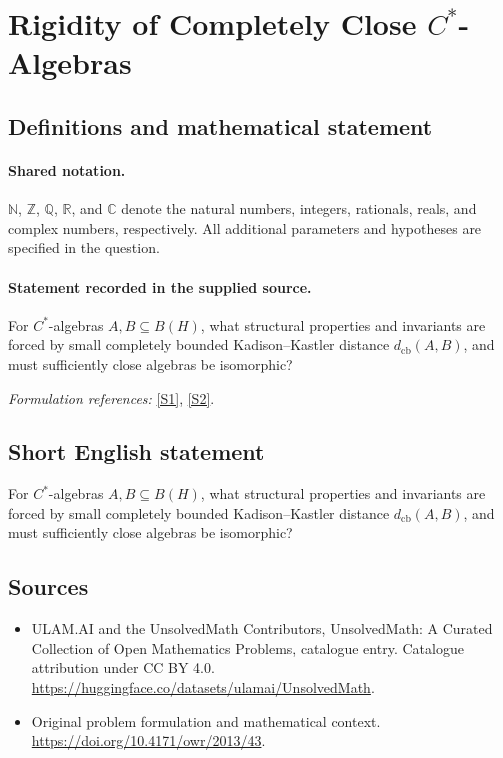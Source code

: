 \documentclass[11pt]{article}
\newcommand{\sref}[2]{\hyperlink{source:#1:#2}{[S#2]}}
\begin{document}
\section{\texorpdfstring{Rigidity of Completely Close $C^*$-Algebras}{Rigidity of Completely Close C\textasciicircum{}*-Algebras}}\label{statement}

\subsection{Definitions and mathematical statement}

\paragraph{Shared notation.}$\mathbb N$, $\mathbb Z$, $\mathbb Q$, $\mathbb R$, and $\mathbb C$ denote the natural numbers, integers, rationals, reals, and complex numbers, respectively. All additional parameters and hypotheses are specified in the question.


\paragraph{Statement recorded in the supplied source.}
For $C^*$-algebras $A,B\subseteq B(H)$, what structural properties and invariants are forced by small completely bounded Kadison–Kastler distance $d_{\mathrm{cb}}(A,B)$, and must sufficiently close algebras be isomorphic?
\par\smallskip\textit{Formulation references:} \sref{statement}{1}, \sref{statement}{2}.
\subsection{Short English statement}
For $C^*$-algebras $A,B\subseteq B(H)$, what structural properties and invariants are forced by small completely bounded Kadison–Kastler distance $d_{\mathrm{cb}}(A,B)$, and must sufficiently close algebras be isomorphic?
\subsection{Sources}
\begin{itemize}
\item[\hypertarget{source:statement:1}{S1}] ULAM.AI and the UnsolvedMath Contributors, UnsolvedMath: A Curated Collection of Open Mathematics Problems, catalogue entry. Catalogue attribution under CC BY 4.0.
\url{https://huggingface.co/datasets/ulamai/UnsolvedMath}.
\item[\hypertarget{source:statement:2}{S2}] Original problem formulation and mathematical context.
\url{https://doi.org/10.4171/owr/2013/43}.
\end{itemize}
\label{end:statement}
\end{document}
